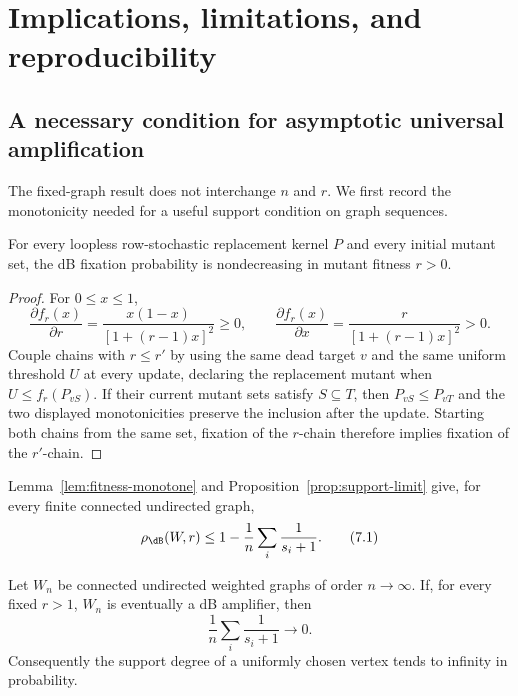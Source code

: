 \section{Implications, limitations, and reproducibility}

\subsection{A necessary condition for asymptotic universal amplification}

The fixed-graph result does not interchange $n$ and $r$.  We first record the
monotonicity needed for a useful support condition on graph sequences.

\begin{lemma}\label{lem:fitness-monotone}
For every loopless row-stochastic replacement kernel $P$ and every initial
mutant set, the dB fixation probability is nondecreasing in mutant fitness
$r>0$.
\end{lemma}

\begin{proof}
For $0\le x\le1$,
\[
 \frac{\partial f_r(x)}{\partial r}
 =\frac{x(1-x)}{[1+(r-1)x]^2}\ge0,
 \qquad
 \frac{\partial f_r(x)}{\partial x}
 =\frac{r}{[1+(r-1)x]^2}>0.
\]
Couple chains with $r\le r'$ by using the same dead target $v$ and the same
uniform threshold $U$ at every update, declaring the replacement mutant when
$U\le f_r(P_{vS})$.  If their current mutant sets satisfy $S\subseteq T$,
then $P_{vS}\le P_{vT}$ and the two displayed monotonicities preserve the
inclusion after the update.  Starting both chains from the same set, fixation
of the $r$-chain therefore implies fixation of the $r'$-chain.
\end{proof}

Lemma~\ref{lem:fitness-monotone} and
Proposition~\ref{prop:support-limit} give, for every finite connected
undirected graph,
\[
 \rho_{\dB}(W,r)\le1-\frac1n\sum_i\frac1{s_i+1}.              \tag{7.1}\label{7.1}
\]

\begin{proposition}\label{prop:degree}
Let $W_n$ be connected undirected weighted graphs of order $n\to\infty$.
If, for every fixed $r>1$, $W_n$ is eventually a dB amplifier, then
\[
 \frac1n\sum_i\frac1{s_i+1}\longrightarrow0.                \tag{7.2}\label{7.2}
\]
Consequently the support degree of a uniformly chosen vertex tends to
infinity in probability.
\end{proposition}


